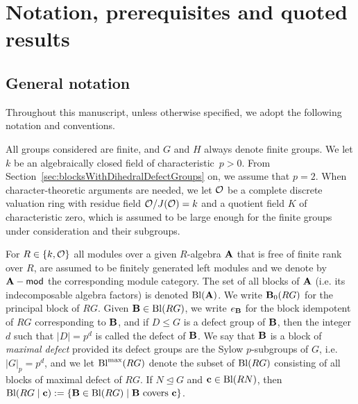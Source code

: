 \section{Notation, prerequisites and quoted results}\label{sec:prelim}%
 

\subsection{General notation}
Throughout this manuscript, unless otherwise specified, we adopt the following notation and conventions.
\par
All groups considered are finite, and $G$ and $H$ always denote finite groups. We let $k$ be an algebraically closed field of characteristic~$p>0$.  From Section~\ref{sec:blocksWithDihedralDefectGroups} on, we assume that $p=2$.
When character-theoretic  arguments are needed, we let  ${\mathcal{O}}$ be a complete discrete valuation ring with residue field ${\mathcal{O}}/J({\mathcal{O}})=k$ and a quotient field $K$ of characteristic zero, which is
assumed to be large enough for the finite groups under consideration and their subgroups. 
\par 
For $R\in\{k,{\mathcal{O}}\}$ all modules over a given $R$-algebra ${\mathbf{A}}$ that is free of finite rank over \(R\), are assumed to be finitely generated left
modules and we denote by ${\mathbf{A}}-\mathsf{mod}$ the corresponding module category.  
The set of all blocks of ${\mathbf{A}}$ (i.e. its indecomposable algebra factors) is denoted $\operatorname{Bl}({\mathbf{A}})$.
We write ${\mathbf{B}}_0(RG)$ for the principal block of $RG$. 
Given ${\mathbf{B}}\in\operatorname{Bl}(RG)$, we write  $e_{{\mathbf{B}}}$  for the block idempotent of $RG$ corresponding to ${\mathbf{B}}$, and 
if $D\leq G$ is a defect group of ${\mathbf{B}}$, then the integer $d$ such that $|D|=p^{d}$ is called the defect of ${\mathbf{B}}$. We say that ${\mathbf{B}}$ is a block of \emph{maximal defect} provided its defect groups are the Sylow $p$-subgroups of $G$, i.e.  $|G|_p=p^d$, and 
we let $\operatorname{Bl}^{\mathrm{max}}(RG)$ denote  the subset of $\operatorname{Bl}(RG)$ consisting of all blocks of maximal defect of $RG$. If $N\unlhd G$ and ${\mathbf{c}}\in\operatorname{Bl}(RN)$, then  $\operatorname{Bl}(RG\mid {\mathbf{c}}):=\{{\mathbf{B}}\in\operatorname{Bl}(RG)\mid {\mathbf{B}}\text{ covers }{\mathbf{c}}\}$.


